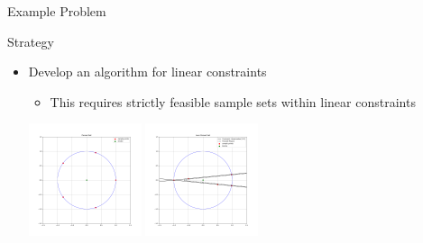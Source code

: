\documentclass{beamer}
\begin{document}
\begin{frame}{Example Problem}

% 
% 
% 
% 
% 
% 
% 

\end{frame}











\begin{frame}{Strategy}
	\begin{itemize}
		\item Develop an algorithm for linear constraints
		\begin{itemize}
			\item This requires strictly feasible sample sets within linear constraints
		\end{itemize}
		\begin{center}
			\includegraphics[width=125px]{images/poised.png}
			\includegraphics[width=125px]{images/not_poised.png}
		\end{center}
	\end{itemize}
\end{frame}
\end{document}
